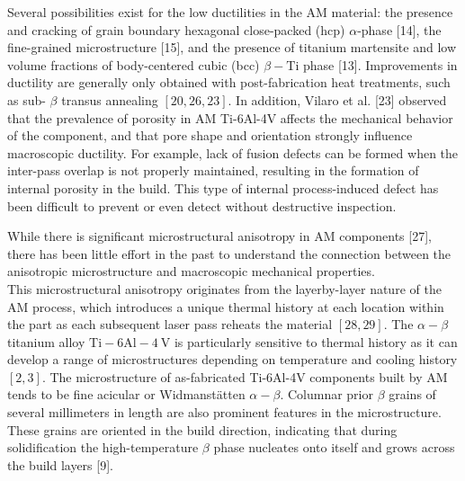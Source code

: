 \documentclass[10pt]{article}
\begin{document}
Several possibilities exist for the low ductilities in the AM material: the presence and cracking of grain boundary hexagonal close-packed (hcp) $\alpha$-phase [14], the fine-grained microstructure [15], and the presence of titanium martensite and low volume fractions of body-centered cubic (bcc) $\beta-\mathrm{Ti}$ phase [13]. Improvements in ductility are generally only obtained with post-fabrication heat treatments, such as sub- $\beta$ transus annealing $[20,26,23]$. In addition, Vilaro et al. [23] observed that the prevalence of porosity in AM Ti-6Al-4V affects the mechanical behavior of the component, and that pore shape and orientation strongly influence macroscopic ductility. For example, lack of fusion defects can be formed when the inter-pass overlap is not properly maintained, resulting in the formation of internal porosity in the build. This type of internal process-induced defect has been difficult to prevent or even detect without destructive inspection.

While there is significant microstructural anisotropy in AM components [27], there has been little effort in the past to understand the connection between the anisotropic microstructure and macroscopic mechanical properties.\\
This microstructural anisotropy originates from the layerby-layer nature of the AM process, which introduces a unique thermal history at each location within the part as each subsequent laser pass reheats the material $[28,29]$. The $\alpha-\beta$ titanium alloy $\mathrm{Ti}-6 \mathrm{Al}-4 \mathrm{~V}$ is particularly sensitive to thermal history as it can develop a range of microstructures depending on temperature and cooling history $[2,3]$. The microstructure of as-fabricated Ti-6Al-4V components built by AM tends to be fine acicular or Widmanstätten $\alpha-\beta$. Columnar prior $\beta$ grains of several millimeters in length are also prominent features in the microstructure. These grains are oriented in the build direction, indicating that during solidification the high-temperature $\beta$ phase nucleates onto itself and grows across the build layers [9].
\end{document}
